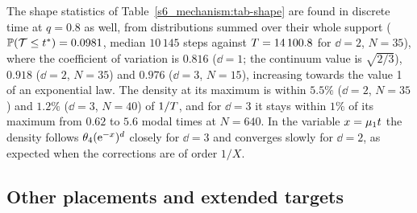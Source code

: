 The shape statistics of Table~\ref{s6_mechanism:tab-shape} are found in discrete time at $q=0.8$ as well, from
distributions summed over their whole support ($\mathbb{P}(\mathcal{T}\le t^{*})=0.0981$, median $10\,145$ steps against
$T=14\,100.8$ for $\dd=2$, $N=35$), where the coefficient of variation is $0.816$ ($\dd=1$; the continuum value is
$\sqrt{2/3}$), $0.918$ ($\dd=2$, $N=35$) and $0.976$ ($\dd=3$, $N=15$), increasing towards the value 1 of an exponential law.
The density at its maximum is within $5.5\%$ ($\dd=2$, $N=35$) and $1.2\%$ ($\dd=3$, $N=40$) of $1/T$, and for $\dd=3$ it
stays within $1\%$ of its maximum from $0.62$ to $5.6$ modal times at $N=640$. In the variable $x=\mu_{1} t$ the density
follows $\theta_4(\mathrm{e}^{-x})^{d}$ closely for $\dd=3$ and converges slowly for $\dd=2$, as expected when the corrections are
of order $1/X$.

\subsection{Other placements and extended targets}\label{sup_mechanism:ssec-geometries}

